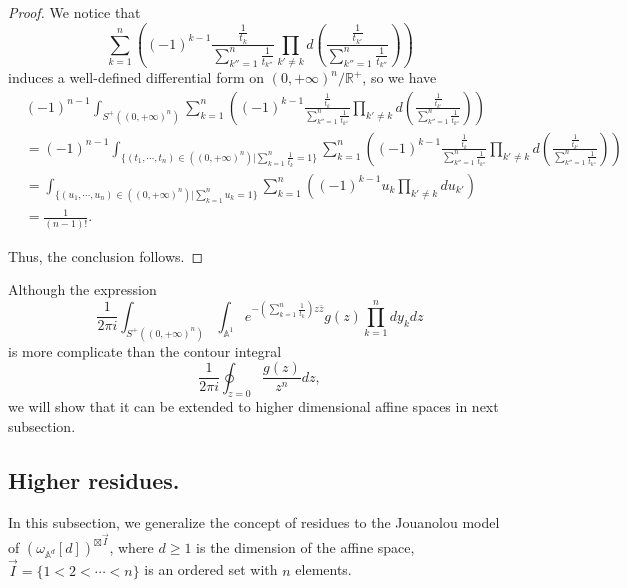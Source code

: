 \documentclass[11pt]{amsart}
\theoremstyle{definition}
\theoremstyle{remark}
\numberwithin{equation}{section}
\begin{document}
\begin{proof}
We notice that
$$
\sum_{k=1}^{n}\left((-1)^{k-1}\frac{\frac{1}{t_{k}}}{\sum_{k''=1}^{n}\frac{1}{t_{k''}}}\prod_{k'\neq k}d(\frac{\frac{1}{t_{k'}}}{\sum_{k''=1}^{n}\frac{1}{t_{k''}}})\right)
$$
induces a well-defined differential form on $(0,+\infty)^{n}/\mathbb{R}^{+}$, so we have
\begin{align*}
&(-1)^{n-1}\int_{S^{+}((0,+\infty)^n)}\sum_{k=1}^{n}\left((-1)^{k-1}\frac{\frac{1}{t_{k}}}{\sum_{k''=1}^{n}\frac{1}{t_{k''}}}\prod_{k'\neq k}d(\frac{\frac{1}{t_{k'}}}{\sum_{k''=1}^{n}\frac{1}{t_{k''}}})\right)\\
&=
(-1)^{n-1}\int_{\{(t_{1},\cdots,t_{n})\in((0,+\infty)^n)|\sum_{k=1}^{n}\frac{1}{t_{k}}=1\}}\sum_{k=1}^{n}\left((-1)^{k-1}\frac{\frac{1}{t_{k}}}{\sum_{k''=1}^{n}\frac{1}{t_{k''}}}\prod_{k'\neq k}d(\frac{\frac{1}{t_{k'}}}{\sum_{k''=1}^{n}\frac{1}{t_{k''}}})\right)\\
&=
\int_{\{(u_{1},\cdots,u_{n})\in((0,+\infty)^n)|\sum_{k=1}^{n}u_{k}=1\}}\sum_{k=1}^{n}\left((-1)^{k-1}u_{k}\prod_{k'\neq k}du_{k'}\right)\\
&=\frac{1}{(n-1)!}.
\end{align*}

Thus, the conclusion follows.
\end{proof}

Although the expression
$$
\frac{1}{2\pi i}\int_{S^{+}((0,+\infty)^n)}\int_{\mathbb{A}^{1}}e^{-\left(\sum_{k=1}^{n}\frac{1}{t_{k}}\right)z\bar{z}}g(z)\prod_{k=1}^{n}dy_{k}dz
$$
is more complicate than the contour integral
$$
\frac{1}{2\pi i}\oint_{z=0}\frac{g(z)}{z^{n}}dz,
$$
we will show that it can be extended to higher dimensional affine spaces in next subsection.

\subsection{Higher residues.}

In this subsection, we generalize the concept of residues to the Jouanolou model of $(\omega_{\mathbb{A}^{d}}[d])^{\boxtimes \vec{I}}$, where $d\geq1$ is the dimension of the affine space, $\vec{I}=\{1<2<\cdots<n\}$ is an ordered set with $n$ elements.
\end{document}
